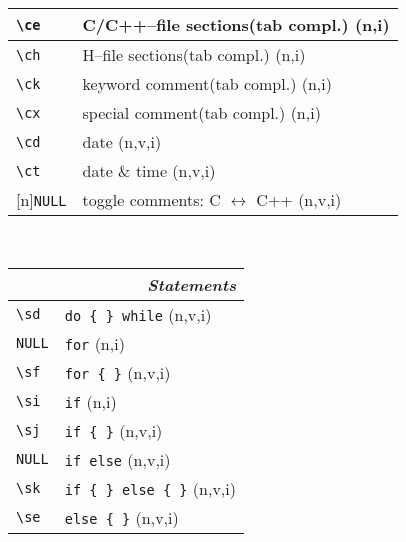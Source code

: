 \documentclass[oneside,11pt,landscape,DIV16]{scrartcl}
\newcommand{\Rep}{{\tiny{[n]}}}
\begin{document}
\begin{multicols}{3}
\begin{center}
\begin{tabular}[]{|p{10mm}|p{60mm}|}
\hline \verb'\ce'& C/C++--file sections\hspace{3mm}\footnotesize{(tab compl.)}    \hfill \normalsize{(n,i)}\\
\hline \verb'\ch'& H--file sections\hspace{10mm}\footnotesize{(tab compl.)}       \hfill \normalsize{(n,i)}\\
\hline \verb'\ck'& keyword comment\hspace{5mm}\footnotesize{(tab compl.)}         \hfill \normalsize{(n,i)}\\
\hline \verb'\cx'& special comment\hspace{7,5mm}\footnotesize{(tab compl.)}       \hfill \normalsize{(n,i)}\\

\hline \verb'\cd' & date                                    \hfill (n,v,i)\\
\hline \verb'\ct' & date \& time                            \hfill (n,v,i)\\
\hline \Rep\verb'NULL' & toggle comments: C $\leftrightarrow$ C++                  \hfill (n,v,i)\\
\hline 
\end{tabular}\\
%
%
\begin{tabular}[]{|p{15mm}|p{55mm}|}
\hline
\multicolumn{2}{|r|}{\textsl{\textbf{S}tatements}} \\
\hline \verb'\sd'  & \verb'do { } while'        \hfill (n,v,i)\\
\hline \verb'NULL'  & \verb'for'                 \hfill (n,i)\\
\hline \verb'\sf' & \verb'for { }'             \hfill (n,v,i)\\
\hline \verb'\si'  & \verb'if'                  \hfill (n,i)\\
\hline \verb'\sj' & \verb'if { }'              \hfill (n,v,i)\\
\hline \verb'NULL' & \verb'if else'             \hfill (n,v,i)\\
\hline \verb'\sk'& \verb'if { } else { }'     \hfill (n,v,i)\\
\hline \verb'\se'  & \verb'else { }'            \hfill (n,v,i)\\

\end{tabular}
\end{center}
\end{multicols}
\end{document}
